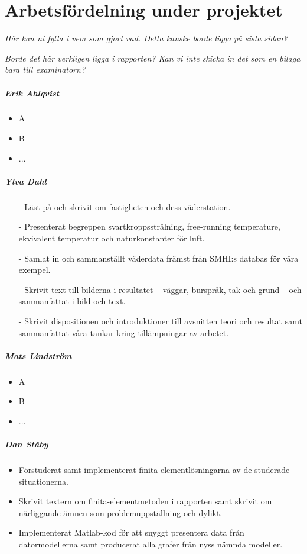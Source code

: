 \chapter{Arbetsfördelning under projektet}

\emph{\color{red}Här kan ni fylla i vem som gjort vad. Detta kanske borde ligga på sista sidan?}

\emph{\color{blue} Borde det här verkligen ligga i rapporten? Kan vi inte skicka in det som en bilaga bara till examinatorn?}


\paragraph{Erik Ahlqvist}
\begin{itemize}
\item A
\item B
\item ...
\end{itemize}


\paragraph{Ylva Dahl}
\begin{itemize}
\item[-] Läst på och skrivit om fastigheten och dess väderstation.
\item[-] Presenterat begreppen svartkroppsstrålning, free-running temperature, ekvivalent temperatur och naturkonstanter för luft.
\item[-] Samlat in och sammanställt väderdata främst från SMHI:s databas för våra exempel.
\item[-] Skrivit text till bilderna i resultatet – väggar, burspråk, tak och grund – och sammanfattat i bild och text.
\item[-] Skrivit dispositionen och introduktioner till avsnitten teori och resultat samt sammanfattat våra tankar kring tillämpningar av arbetet.
\end{itemize}


\paragraph{Mats Lindström}
\begin{itemize}
\item A
\item B
\item ...
\end{itemize}


\paragraph{Dan Ståby}
\begin{itemize}
\item Förstuderat samt implementerat finita-elementlösningarna av de studerade situationerna.
\item Skrivit textern om finita-elementmetoden i rapporten samt skrivit om närliggande ämnen som problemuppställning och dylikt. 
\item Implementerat Matlab-kod för att snyggt presentera data från datormodellerna samt producerat alla grafer från
nyss nämnda modeller.
\end{itemize}
